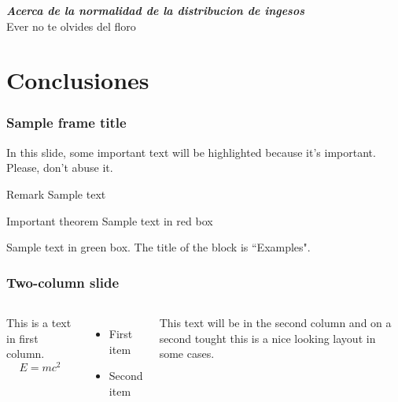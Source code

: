 \documentclass{beamer}
\begin{document}


\begin{frame}
  \textbf{\textit{
    Acerca de la normalidad de la distribucion de ingesos
  }} \\
  \alert{Ever no te olvides del floro}
\end{frame}

\section{Conclusiones}

\begin{frame}
\frametitle{Sample frame title}

In this slide, some important text will be
\alert{highlighted} because it's important.
Please, don't abuse it.

\begin{block}{Remark}
Sample text
\end{block}

\begin{alertblock}{Important theorem}
Sample text in red box
\end{alertblock}

\begin{examples}
Sample text in green box. The title of the block is ``Examples".
\end{examples}
\end{frame}


\begin{frame}
\frametitle{Two-column slide}

\begin{columns}

This is a text in first column.
$$E=mc^2$$
\begin{itemize}
\item First item
\item Second item
\end{itemize}

This text will be in the second column
and on a second tought this is a nice looking
layout in some cases.
\end{columns}
\end{frame}
\end{document}
